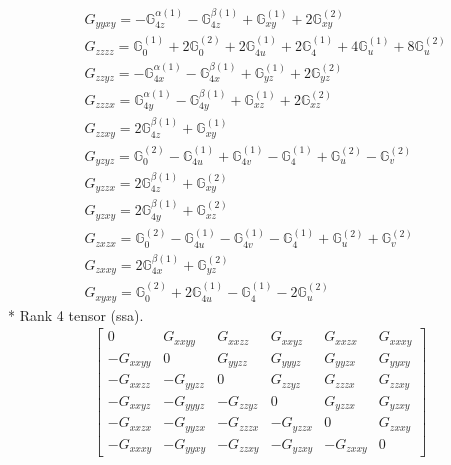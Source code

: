 \documentclass[fleqn,8pt,landscape]{jsarticle}
\begin{document}
\begin{align*}
& G_{yyxy} = - \mathbb{G}_{4z}^{\alpha(1)} - \mathbb{G}_{4z}^{\beta(1)} + \mathbb{G}_{xy}^{(1)} + 2 \mathbb{G}_{xy}^{(2)} \\
& G_{zzzz} = \mathbb{G}_{0}^{(1)} + 2 \mathbb{G}_{0}^{(2)} + 2 \mathbb{G}_{4u}^{(1)} + 2 \mathbb{G}_{4}^{(1)} + 4 \mathbb{G}_{u}^{(1)} + 8 \mathbb{G}_{u}^{(2)} \\
& G_{zzyz} = - \mathbb{G}_{4x}^{\alpha(1)} - \mathbb{G}_{4x}^{\beta(1)} + \mathbb{G}_{yz}^{(1)} + 2 \mathbb{G}_{yz}^{(2)} \\
& G_{zzzx} = \mathbb{G}_{4y}^{\alpha(1)} - \mathbb{G}_{4y}^{\beta(1)} + \mathbb{G}_{xz}^{(1)} + 2 \mathbb{G}_{xz}^{(2)} \\
& G_{zzxy} = 2 \mathbb{G}_{4z}^{\beta(1)} + \mathbb{G}_{xy}^{(1)} \\
& G_{yzyz} = \mathbb{G}_{0}^{(2)} - \mathbb{G}_{4u}^{(1)} + \mathbb{G}_{4v}^{(1)} - \mathbb{G}_{4}^{(1)} + \mathbb{G}_{u}^{(2)} - \mathbb{G}_{v}^{(2)} \\
& G_{yzzx} = 2 \mathbb{G}_{4z}^{\beta(1)} + \mathbb{G}_{xy}^{(2)} \\
& G_{yzxy} = 2 \mathbb{G}_{4y}^{\beta(1)} + \mathbb{G}_{xz}^{(2)} \\
& G_{zxzx} = \mathbb{G}_{0}^{(2)} - \mathbb{G}_{4u}^{(1)} - \mathbb{G}_{4v}^{(1)} - \mathbb{G}_{4}^{(1)} + \mathbb{G}_{u}^{(2)} + \mathbb{G}_{v}^{(2)} \\
& G_{zxxy} = 2 \mathbb{G}_{4x}^{\beta(1)} + \mathbb{G}_{yz}^{(2)} \\
& G_{xyxy} = \mathbb{G}_{0}^{(2)} + 2 \mathbb{G}_{4u}^{(1)} - \mathbb{G}_{4}^{(1)} - 2 \mathbb{G}_{u}^{(2)}
\end{align*}
* Rank 4 tensor (ssa).
\begin{align*}
\begin{bmatrix} 0 & G_{xxyy} & G_{xxzz} & G_{xxyz} & G_{xxzx} & G_{xxxy} \\ - G_{xxyy} & 0 & G_{yyzz} & G_{yyyz} & G_{yyzx} & G_{yyxy} \\ - G_{xxzz} & - G_{yyzz} & 0 & G_{zzyz} & G_{zzzx} & G_{zzxy} \\ - G_{xxyz} & - G_{yyyz} & - G_{zzyz} & 0 & G_{yzzx} & G_{yzxy} \\ - G_{xxzx} & - G_{yyzx} & - G_{zzzx} & - G_{yzzx} & 0 & G_{zxxy} \\ - G_{xxxy} & - G_{yyxy} & - G_{zzxy} & - G_{yzxy} & - G_{zxxy} & 0 \end{bmatrix}
\end{align*}
\end{document}
